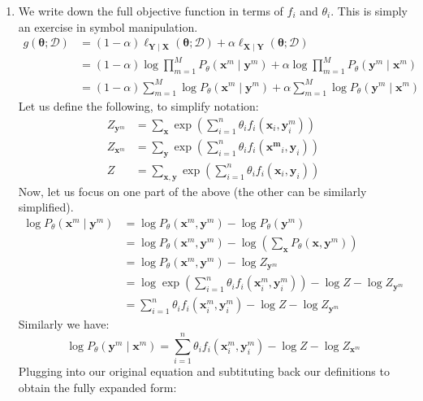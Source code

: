 \documentclass[12pt]{article}
\newcommand{\vect}[1]{\boldsymbol{#1}}
\begin{document}
\begin{enumerate}[label=(\alph*)]
  \item We write down the full objective function in terms of $f_i$ and $\theta_i$. This is simply an exercise in symbol manipulation.
  \begin{align*}
  	g(\vect{\theta}; \mathcal{D}) &= (1-\alpha)\ell_{\vect{Y}\mid \vect{X}}(\vect{\theta}; \mathcal{D}) + \alpha\ell_{\vect{X}\mid\vect{Y}}(\vect{\theta}; \mathcal{D}) \\
  	&= (1- \alpha)\log \prod_{m=1}^M P_{\theta}(\vect{x}^m \mid \vect{y}^m) + \alpha \log \prod_{m=1}^M P_{\theta}(\vect{y}^m \mid \vect{x}^m) \\
  	&= (1- \alpha)\sum_{m=1}^M \log P_{\theta}(\vect{x}^m \mid \vect{y}^m) + \alpha \sum_{m=1}^M \log P_{\theta}(\vect{y}^m \mid \vect{x}^m)
  \end{align*}
  Let us define the following, to simplify notation:
  \begin{align*}
  	Z_{\vect{y}^m} &= \sum_{\vect{x}} \exp\left(\sum_{i =1}^n \theta_i f_i(\vect{x}_i, \vect{y}^m_i)\right) \\
  	Z_{\vect{x}^m} &= \sum_{\vect{y}} \exp\left(\sum_{i =1}^n \theta_i f_i(\vect{x^m}_i, \vect{y}_i)\right) \\
  	Z &= \sum_{\vect{x}, \vect{y}} \exp\left(\sum_{i=1}^n \theta_i f_i(\vect{x}_i, \vect{y}_i)\right)
  \end{align*}
  Now, let us focus on one part of the above (the other can be similarly simplified). 
  \begin{align*}
  	\log P_{\theta}(\vect{x}^m \mid \vect{y}^m) &= \log P_{\theta}(\vect{x}^m, \vect{y}^m) - \log P_{\theta}(\vect{y}^m) \tag{Bayes Rule} \\
  	&= \log P_{\theta}(\vect{x}^m, \vect{y}^m) - \log \left(\sum_{\vect{x}} P_{\theta}(\vect{x}, \vect{y}^m)\right)\\
  	&= \log P_{\theta}(\vect{x}^m, \vect{y}^m) - \log Z_{\vect{y}^m} \\
  	&= \log \exp(\sum_{i=1}^n \theta_i f_i(\vect{x}^m_i, \vect{y}^m_i)) - \log Z - \log Z_{\vect{y}^m} \\
  	&= \sum_{i=1}^n \theta_i f_i (\vect{x}_i^m, \vect{y}_i^m) - \log Z - \log Z_{\vect{y}^m}
  \end{align*}
  Similarly we have:
  $$
		\log P_{\theta}(\vect{y}^m \mid \vect{x}^m) = \sum_{i=1}^n \theta_i f_i (\vect{x}_i^m, \vect{y}_i^m) - \log Z - \log Z_{\vect{x}^m}
  $$
  Plugging into our original equation and subtituting back our definitions to obtain the fully expanded form:

\end{enumerate}
\end{document}
